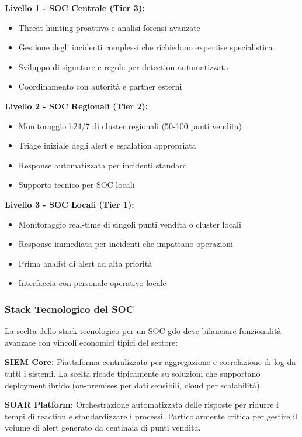 \textbf{Livello 1 - SOC Centrale (Tier 3):}
\begin{itemize}
\item Threat hunting proattivo e analisi forensi avanzate
\item Gestione degli incidenti complessi che richiedono expertise specialistica
\item Sviluppo di signature e regole per detection automatizzata
\item Coordinamento con autorità e partner esterni
\end{itemize}

\textbf{Livello 2 - SOC Regionali (Tier 2):}
\begin{itemize}
\item Monitoraggio h24/7 di cluster regionali (50-100 punti vendita)
\item Triage iniziale degli alert e escalation appropriata
\item Response automatizzata per incidenti standard
\item Supporto tecnico per SOC locali
\end{itemize}

\textbf{Livello 3 - SOC Locali (Tier 1):}
\begin{itemize}
\item Monitoraggio real-time di singoli punti vendita o cluster locali
\item Response immediata per incidenti che impattano operazioni
\item Prima analisi di alert ad alta priorità
\item Interfaccia con personale operativo locale
\end{itemize}

\subsubsection{Stack Tecnologico del SOC}

La scelta dello stack tecnologico per un SOC \gls{gdo} deve bilanciare funzionalità avanzate con vincoli economici tipici del settore:

\textbf{SIEM Core:} Piattaforma centralizzata per aggregazione e correlazione di log da tutti i sistemi. La scelta ricade tipicamente su soluzioni che supportano deployment ibrido (on-premises per dati sensibili, cloud per scalabilità).

\textbf{SOAR Platform:} Orchestrazione automatizzata delle risposte per ridurre i tempi di reaction e standardizzare i processi. Particolarmente critica per gestire il volume di alert generato da centinaia di punti vendita.

